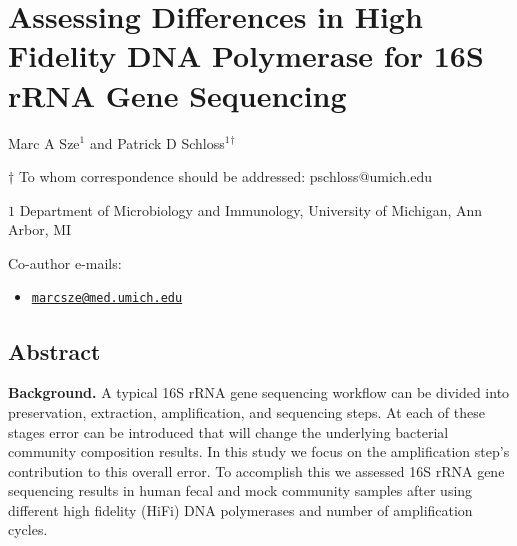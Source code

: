 \documentclass[11pt,]{article}
\title{}
\author{}
\date{}
\providecommand{\tightlist}{%
  \setlength{\itemsep}{0pt}\setlength{\parskip}{0pt}}
\begin{document}
\section{Assessing Differences in High Fidelity DNA Polymerase for 16S
rRNA Gene
Sequencing}\label{assessing-differences-in-high-fidelity-dna-polymerase-for-16s-rrna-gene-sequencing}

\begin{center}
\vspace{25mm}

Marc A Sze${^1}$ and Patrick D Schloss${^1}$${^\dagger}$

\vspace{20mm}

$\dagger$ To whom correspondence should be addressed: pschloss@umich.edu

$1$ Department of Microbiology and Immunology, University of Michigan, Ann Arbor, MI




\end{center}

Co-author e-mails:

\begin{itemize}
\tightlist
\item
  \href{mailto:marcsze@med.umich.edu}{\nolinkurl{marcsze@med.umich.edu}}
\end{itemize}

\newpage

\linenumbers

\subsection{Abstract}\label{abstract}

\textbf{Background.} A typical 16S rRNA gene sequencing workflow can be
divided into preservation, extraction, amplification, and sequencing
steps. At each of these stages error can be introduced that will change
the underlying bacterial community composition results. In this study we
focus on the amplification step's contribution to this overall error. To
accomplish this we assessed 16S rRNA gene sequencing results in human
fecal and mock community samples after using different high fidelity
(HiFi) DNA polymerases and number of amplification cycles.
\end{document}
